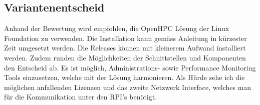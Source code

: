 \subsection{Variantenentscheid}
Anhand der Bewertung wird empfohlen, die OpenHPC Lösung der Linux Foundation zu verwenden. Die Installation kann gemäss Anleitung in kürzester Zeit umgesetzt werden. Die Releases können mit kleinerem Aufwand installiert werden. Zudem runden die Möglichkeiten der Schnittstellen und Komponenten den Entscheid ab. Es ist möglich, Administrations- sowie Performance Monitoring Tools einzusetzen, welche mit der Lösung harmonieren. Als Hürde sehe ich die möglichen anfallenden Lizenzen und das zweite Netzwerk Interface, welches man für die Kommunikation unter den RPI’s benötigt.